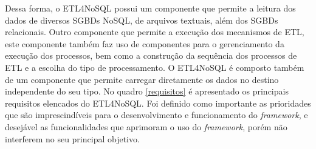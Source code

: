 Dessa forma, o ETL4NoSQL possui um componente que permite a leitura dos dados de diversos SGBDs NoSQL, de arquivos textuais, além dos SGBDs relacionais. Outro componente que permite a execução dos mecanismos de ETL, este componente também faz uso de componentes para o gerenciamento da execução dos processos, bem como a construção da sequência dos processos de ETL e a escolha do tipo de processamento. O ETL4NoSQL é composto também de um componente que permite carregar diretamente os dados no destino independente do seu tipo. No quadro \ref{requisitos} é apresentado os principais requisitos elencados do ETL4NoSQL. Foi definido como importante as prioridades que são imprescindíveis para o desenvolvimento e funcionamento do \textit{framework}, e desejável as funcionalidades que aprimoram o uso do \textit{framework}, porém não interferem no seu principal objetivo.

